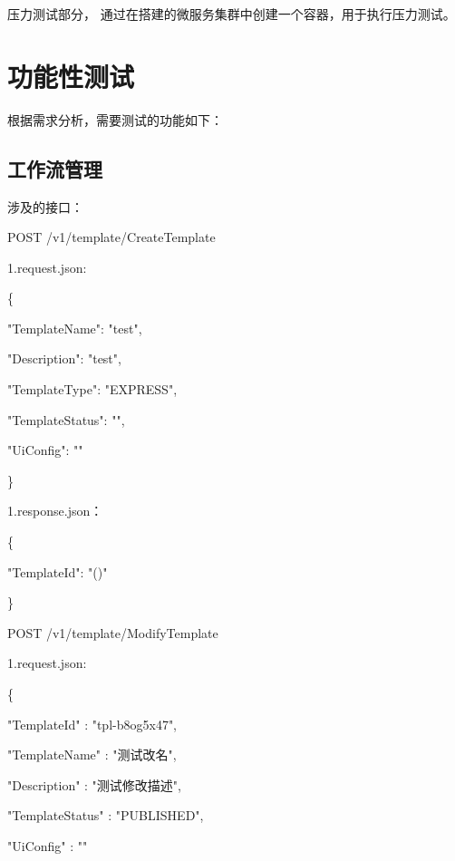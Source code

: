 压力测试部分， 通过在搭建的微服务集群中创建一个容器，用于执行压力测试。


\section{功能性测试}
根据需求分析，需要测试的功能如下：

\subsection{工作流管理}

涉及的接口：

POST /v1/template/CreateTemplate

1.request.json:

\{

"TemplateName": "test",

"Description": "test",

"TemplateType": "EXPRESS",


"TemplateStatus": "",

"UiConfig": ""

\}

1.response.json：

\{

"TemplateId": "\@exists()"

\}


POST /v1/template/ModifyTemplate

1.request.json:

\{

"TemplateId"          : "tpl-b8og5x47",

"TemplateName"        : "测试改名",

"Description"         : "测试修改描述",


"TemplateStatus"      : "PUBLISHED",

"UiConfig"            : ""

